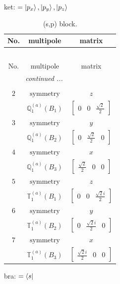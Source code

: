 \documentclass[fleqn,8pt,landscape]{jsarticle}
\begin{document}
\noindent
ket: $=\ket{p_{x}}, \ket{p_{y}}, \ket{p_{z}}$
\renewcommand{\arraystretch}{1.6}
\begin{longtable}{ccc}
\caption{(s,p) block.}
 \\
 \hline \hline
No. & multipole & matrix \\ \hline \endfirsthead

\multicolumn{2}{l}{\tablename\ \thetable{}} \\
 \hline \hline
No. & multipole & matrix \\ \hline \endhead

 \hline \hline
\multicolumn{2}{r}{\footnotesize\it continued ...} \\ \endfoot

 \hline \hline
\multicolumn{2}{r}{} \\ \endlastfoot

$ 2 $ & $ \text{symmetry} $ & $ z $ \\
$  $ & $ \mathbb{Q}_{1}^{(a)}(B_{1}) $ & $ \begin{bmatrix} 0 & 0 & \frac{\sqrt{2}}{2} \end{bmatrix} $ \\ \hline
$ 3 $ & $ \text{symmetry} $ & $ y $ \\
$  $ & $ \mathbb{Q}_{1}^{(a)}(B_{2}) $ & $ \begin{bmatrix} 0 & \frac{\sqrt{2}}{2} & 0 \end{bmatrix} $ \\ \hline
$ 4 $ & $ \text{symmetry} $ & $ x $ \\
$  $ & $ \mathbb{Q}_{1}^{(a)}(B_{3}) $ & $ \begin{bmatrix} \frac{\sqrt{2}}{2} & 0 & 0 \end{bmatrix} $ \\ \hline
$ 5 $ & $ \text{symmetry} $ & $ z $ \\
$  $ & $ \mathbb{T}_{1}^{(a)}(B_{1}) $ & $ \begin{bmatrix} 0 & 0 & \frac{\sqrt{2} i}{2} \end{bmatrix} $ \\ \hline
$ 6 $ & $ \text{symmetry} $ & $ y $ \\
$  $ & $ \mathbb{T}_{1}^{(a)}(B_{2}) $ & $ \begin{bmatrix} 0 & \frac{\sqrt{2} i}{2} & 0 \end{bmatrix} $ \\ \hline
$ 7 $ & $ \text{symmetry} $ & $ x $ \\
$  $ & $ \mathbb{T}_{1}^{(a)}(B_{3}) $ & $ \begin{bmatrix} \frac{\sqrt{2} i}{2} & 0 & 0 \end{bmatrix} $ \\ \hline
\end{longtable}
bra: $=\bra{s}$
\end{document}
